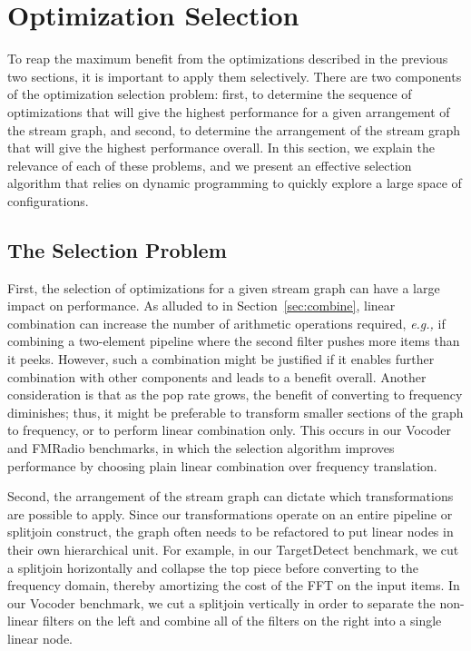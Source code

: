 
\section{Optimization Selection}
\label{sec:partitioning}

To reap the maximum benefit from the optimizations described in the
previous two sections, it is important to apply them selectively.
There are two components of the optimization selection problem: first,
to determine the sequence of optimizations that will give the highest
performance for a given arrangement of the stream graph, and second,
to determine the arrangement of the stream graph that will give the
highest performance overall.  In this section, we explain the
relevance of each of these problems, and we present an effective
selection algorithm that relies on dynamic programming to quickly
explore a large space of configurations.

\subsection{The Selection Problem}

First, the selection of optimizations for a given stream graph can
have a large impact on performance.  As alluded to in
Section~\ref{sec:combine}, linear combination can increase the number
of arithmetic operations required, {\it e.g.,} if combining a
two-element pipeline where the second filter pushes more items than it
peeks.  However, such a combination might be justified if it enables
further combination with other components and leads to a benefit
overall.  Another consideration is that as the pop rate grows, the
benefit of converting to frequency diminishes; thus, it might be
preferable to transform smaller sections of the graph to frequency, or
to perform linear combination only.  This occurs in our Vocoder and
FMRadio benchmarks, in which the selection algorithm improves
performance by choosing plain linear combination over frequency
translation.

Second, the arrangement of the stream graph can dictate which
transformations are possible to apply.  Since our transformations
operate on an entire pipeline or splitjoin construct, the graph often
needs to be refactored to put linear nodes in their own hierarchical
unit.  For example, in our TargetDetect benchmark, we cut a splitjoin
horizontally and collapse the top piece before converting to the
frequency domain, thereby amortizing the cost of the FFT on the input
items.
In our Vocoder benchmark, we cut a splitjoin vertically in order to
separate the non-linear filters on the left and combine all of the
filters on the right into a single linear node.


